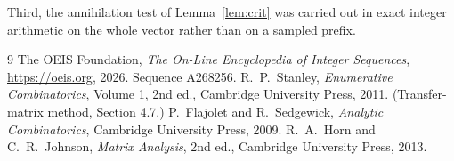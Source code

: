 \documentclass[11pt,a4paper]{article}
\theoremstyle{plain}
\theoremstyle{definition}
\begin{document}
Third, the annihilation test of Lemma~\ref{lem:crit} was carried out in exact integer
arithmetic on the whole vector rather than on a sampled prefix.

\begin{thebibliography}{9}
 The OEIS Foundation, \emph{The On-Line Encyclopedia of Integer
Sequences}, \url{https://oeis.org}, 2026. Sequence A268256.
 R.~P.~Stanley, \emph{Enumerative Combinatorics}, Volume 1, 2nd ed.,
Cambridge University Press, 2011. (Transfer-matrix method, Section 4.7.)
 P.~Flajolet and R.~Sedgewick, \emph{Analytic Combinatorics}, Cambridge
University Press, 2009.
 R.~A.~Horn and C.~R.~Johnson, \emph{Matrix Analysis}, 2nd ed., Cambridge
University Press, 2013.
\end{thebibliography}
\end{document}
